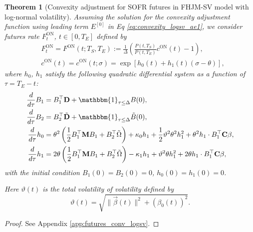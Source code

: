 \documentclass[pdftex,11pt,a4paper] {article}
\newtheorem{theorem}{Theorem}[section]
\begin{document}
\begin{theorem}[Convexity adjustment for SOFR futures in FHJM-SV model with log-normal volatility]\label{thm:futures_conv_logsv}
Assuming the solution for the convexity adjustment function using leading term $E^{[0]}$ in Eq \eqref{eq:convexity_logsv_ae1}, we consider futures rate $F^{\mathrm{ON}}_t$, $t\in[0,T_E]$  defined by
\begin{equation}\label{eq:fut_rate_approx}
\begin{split}
& F^{\mathrm{ON}}_t= F^{\mathrm{ON}}(t;T_S,T_E):=\frac{1}{\Delta}\left(\frac{P(t,T_S)}{P(t,T_E)} c^{\mathrm{ON}}(t)-1\right),\\
& c^{\mathrm{ON}}(t)=c^{\mathrm{ON}}(t;\sigma)=\exp\left[h_0(t)+h_1(t)(\sigma-\theta) \right],
\end{split}
\end{equation}
where $h_0$, $h_1$ satisfy the following quadratic differential system as a function of $\tau=T_E-t$:
\begin{equation}\label{eq:MF_conv_adj_ODE_logsv}
\begin{split}
\frac{d}{d\tau}B_1&=B_1^\top \mathbf{D}+\mathbbm{1}_{\tau\le \Delta}B(0),\\
\frac{d}{d\tau}B_2&=B_2^\top \tilde{\mathbf{D}}+\mathbbm{1}_{\tau\le \Delta}\tilde B(0),\\
\frac{d}{d\tau}h_0&=\theta^2\left(\frac{1}{2}B_1^\top\mathbf{M}B_1 +B_2^\top\tilde{\Omega}\right)+\kappa_0h_1+\frac{1}{2}\vartheta^2\theta^2h_1^2+\theta^2h_1\cdot B_1^\top\mathbf{C}\beta,\\
\frac{d}{d\tau}h_1&=2\theta\left(\frac{1}{2}B_1^\top\mathbf{M}B_1 +B_2^\top\tilde{\Omega}\right)-\kappa_1h_1+ \vartheta^2\theta h_1^2+2\theta h_1\cdot B_1^\top\mathbf{C}\beta,
\end{split}
\end{equation}
with the initial condition $B_1(0)=B_2(0)=0$, $h_0(0)=h_1(0)=0$.

Here $\vartheta(t)$ is the total volatility of volatility defined by
\begin{equation}\label{eq:vartheta_logsv}
\vartheta(t)=\sqrt{\|\vec{\beta}(t)\|^2+(\beta_0(t))^2}.
\end{equation}
\end{theorem}

\begin{proof}
See Appendix \ref{app:futures_conv_logsv}.
\end{proof}
\end{document}
